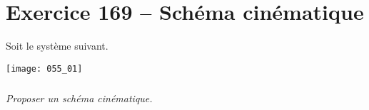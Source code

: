 \section*{Exercice 169 -- Schéma cinématique}

\setcounter{exo}{0}

Soit le système suivant. 

\begin{center}
 \texttt{[image: 055\_01]}
\end{center}



\subparagraph{}
\textit{Proposer un schéma cinématique.}
 \ifprof
 \begin{corrige}
 
 \end{corrige}
 \else
 \fi

